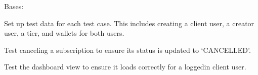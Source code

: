 \documentclass[letterpaper,10pt,english]{sphinxmanual}
\begin{document}
\begin{fulllineitems}
\label{\detokenize{modules/tests:client.tests.ClientTests}}
\pysigstartsignatures
{}
\pysigstopsignatures
\sphinxAtStartPar
Bases: 

\begin{fulllineitems}
\label{\detokenize{modules/tests:client.tests.ClientTests.setUp}}
\pysigstartsignatures
{}
\pysigstopsignatures
\sphinxAtStartPar
Set up test data for each test case. This includes creating a client user,
a creator user, a tier, and wallets for both users.

\end{fulllineitems}


\begin{fulllineitems}
\label{\detokenize{modules/tests:client.tests.ClientTests.test_cancel_subscription}}
\pysigstartsignatures
{}
\pysigstopsignatures
\sphinxAtStartPar
Test canceling a subscription to ensure its status is updated to ‘CANCELLED’.

\end{fulllineitems}


\begin{fulllineitems}
\label{\detokenize{modules/tests:client.tests.ClientTests.test_dashboard}}
\pysigstartsignatures
{}
\pysigstopsignatures
\sphinxAtStartPar
Test the dashboard view to ensure it loads correctly for a logged\sphinxhyphen{}in client user.

\end{fulllineitems}


\end{fulllineitems}
\end{document}
